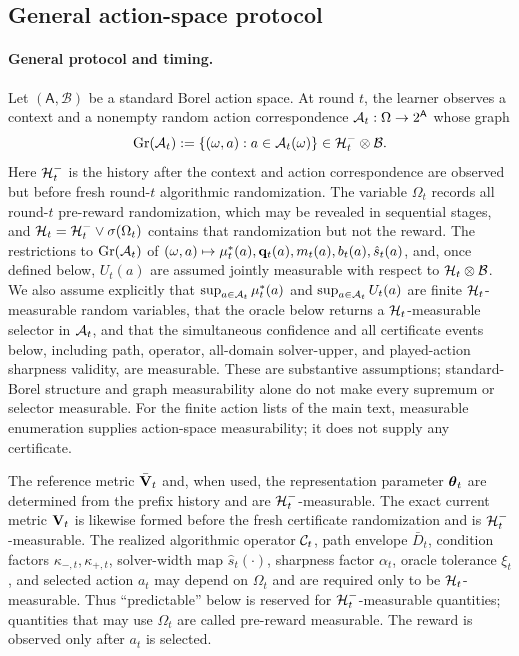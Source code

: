 \subsection{General action-space protocol}
\label{app:general-protocol}

\paragraph{General protocol and timing.}
Let $(\mathsf A,\mathcal B)$ be a standard Borel action space.  At round $t$,
the learner observes a context and a nonempty random action correspondence
$\mathcal{A}_t:\Omega\to 2^{\mathsf A}$ whose graph
\[
 \operatorname{Gr}(\mathcal{A}_t)
 :=\{(\omega,a):a\in\mathcal{A}_t(\omega)\}
 \in\mathcal{H}_t^-\otimes\mathcal B.
\]
Here $\mathcal{H}_t^-$ is the history after the context and action correspondence
are observed but before fresh round-$t$ algorithmic randomization.  The variable
$\Omega_t$ records all round-$t$ pre-reward randomization, which may be revealed
in sequential stages, and $\mathcal{H}_t=\mathcal{H}_t^-\vee\sigma(\Omega_t)$ contains
that randomization but not the reward.  The restrictions to
$\operatorname{Gr}(\mathcal{A}_t)$ of
$(\omega,a)\mapsto\mu_t^*(a),\mathbf{q}_t(a),m_t(a),b_t(a),\hat s_t(a)$, and, once
defined below, $U_t(a)$ are assumed jointly measurable with respect to
$\mathcal{H}_t\otimes\mathcal B$.  We also assume explicitly that
$\sup_{a\in\mathcal{A}_t}\mu_t^*(a)$ and $\sup_{a\in\mathcal{A}_t}U_t(a)$ are finite
$\mathcal{H}_t$-measurable random variables, that the oracle below returns a $\mathcal{H}_t$-measurable
selector in $\mathcal{A}_t$, and that the simultaneous confidence and all certificate
events below, including path, operator, all-domain solver-upper, and
played-action sharpness validity, are measurable.  These are
substantive assumptions; standard-Borel structure
and graph measurability alone do not make every supremum or selector measurable.
For the finite action lists of the main text, measurable enumeration supplies
action-space measurability; it does not supply any certificate.

The reference metric $\bar{\mathbf{V}}_t$ and, when used, the representation parameter
$\boldsymbol{\theta}_t$ are determined from the prefix history and are
$\mathcal{H}_t^-$-measurable.  The exact current metric $\mathbf{V}_t$ is likewise formed
before the fresh certificate randomization and is $\mathcal{H}_t^-$-measurable.  The realized algorithmic operator
$\mathcal{C}_t$, path envelope $\bar D_t$, condition factors
$\kappa_{-,t},\kappa_{+,t}$, solver-width map $\hat s_t(\cdot)$, sharpness
factor $\alpha_t$, oracle tolerance $\xi_t$, and selected action $a_t$ may
depend on $\Omega_t$ and are required only to be $\mathcal{H}_t$-measurable.  Thus
``predictable'' below is reserved for $\mathcal{H}_t^-$-measurable quantities;
quantities that may use $\Omega_t$ are called pre-reward measurable.  The
reward is observed only after $a_t$ is selected.

